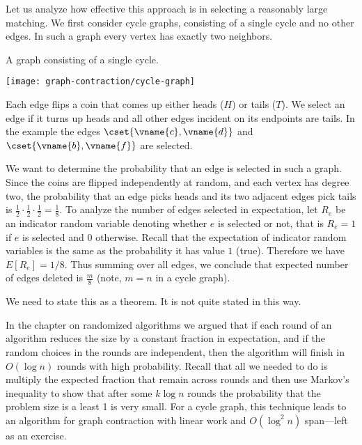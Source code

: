 {\begin{example}
\end{example}


Let us analyze how effective this
approach is in selecting a reasonably large matching.  We first
consider cycle graphs, consisting of a single cycle and no other
edges.  In such a graph every vertex has exactly two neighbors.
\begin{example}
A graph consisting of a single cycle.    
  \begin{center}
  \texttt{[image: graph-contraction/cycle-graph]}
  \end{center}
Each edge flips a coin that 
comes up either heads ($H$) or tails ($T$).    We select an edge if it 
turns up heads and all other edges incident on its endpoints are 
tails.    In the example  the edges $\cset{\vname{c},\vname{d}}$
and $\cset{\vname{b},\vname{f}}$
are selected.
 \end{example}
We want to
determine the probability that an edge is selected in such a graph.
Since the coins
are flipped independently at random, and each vertex has degree two, the probability that an edge
picks heads and its two adjacent edges pick tails is $\frac{1}{2}
\cdot \frac{1}{2} \cdot \frac{1}{2} = \frac{1}{8}$.   To
analyze the number of  edges  selected in expectation,   let $R_e$ be an
indicator random variable denoting whether $e$ is selected or not,
that is $R_e = 1$ if $e$ is selected and $0$ otherwise.  Recall that
the expectation of indicator random variables is the same as the
probability it has value $1$ (true).  Therefore we have $E[R_e] =
1/8$.
%
Thus summing over all edges, we conclude that expected number of edges
deleted is $\frac{m}{8}$ (note, $m=n$ in a cycle graph). 

\begin{todo}
We need to state this as a theorem.  It is not quite stated in this way.
\end{todo}

In the chapter on randomized algorithms  we argued
that if each round of an algorithm reduces the size by a constant
fraction in expectation, and if the random choices in the rounds are
independent, then the algorithm will finish in $O(\log n)$ rounds with
high probability.  Recall that all we needed to do is multiply the
expected fraction that remain across rounds and then use Markov's
inequality to show that after some $k \log n$ rounds the probability
that the problem size is a least 1 is very small.  For a cycle graph,
this technique leads to an algorithm for graph contraction with linear
work and $O(\log^2{n})$ span---left as an exercise.

}
